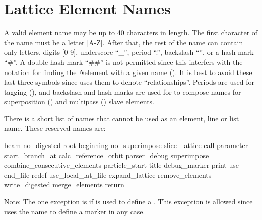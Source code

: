 \section{Lattice Element Names}
\label{s:ele.names}

A valid element name may be up to 40 characters in length. The first character of the name must be a
letter [A-Z]. After that, the rest of the name can contain only letters, digits [0-9], underscore
``_'', period ``.'', backslash ``\B'', or a hash mark ``\#''. A double hash mark ``\#\#'' is not
permitted since this interfers with the notation for finding the $N$\Th element with a given name
(). It is best to avoid these last three symbols since \bmad uses them to denote
``relationships''. Periods are used for tagging (), and backslash and hash marks are
used for to compose names for superposition () and multipass ()
slave elements.

There is a short list of names that cannot be used as an element, line or list name. These reserved names are:
\begin{example}
  beam                             no_digested                  root
  beginning                        no_superimpose               slice_lattice
  call                             parameter                    start_branch_at
  calc_reference_orbit             parser_debug                 superimpose
  combine_consecutive_elements     particle_start               title
  debug_marker                     print                        use
  end_file                         redef                        use_local_lat_file
  expand_lattice                   remove_elements              write_digested
  merge_elements                   return
\end{example}
Note: The one exception is if  is used to define a . This exception is allowed
since \bmad uses the  name to define a marker in any case.

